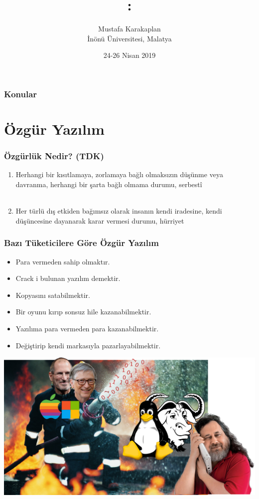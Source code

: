 \documentclass[english,svgnames,notes=hide,12pt]{beamer}
\title{\large\seminarname:\\\large\presentationtitle}
\author{Mustafa Karakaplan\\
    \small İnönü Üniversitesi, Malatya
}
\date{24-26 Nisan 2019}
\begin{document}
\thispagestyle{empty}
\begin{frame}
    \titlepage
\end{frame}

\begin{frame}
    \frametitle{Konular}
    \tableofcontents
\end{frame}


\section{Özgür Yazılım}

\begin{frame}
\frametitle{Özgürlük Nedir? (TDK)}

\begin{enumerate}[<+->]
\item  Herhangi bir kısıtlamaya, zorlamaya bağlı olmaksızın düşünme veya davranma, herhangi bir şarta bağlı olmama durumu, serbestî\\
~\\
\item Her türlü dış etkiden bağımsız olarak insanın kendi iradesine, kendi düşüncesine dayanarak karar vermesi durumu, hürriyet
\end{enumerate}

\end{frame}

\begin{frame}
\frametitle{Bazı Tüketicilere Göre Özgür Yazılım}
\begin{itemize}[<+->]
    \item Para vermeden sahip olmaktır.
    \item Crack i bulunan yazılım demektir.
    \item Kopyasını satabilmektir.
    \item Bir oyunu kırıp sonsuz hile kazanabilmektir. 
    \item Yazılıma para vermeden para kazanabilmektir.
    \item Değiştirip kendi markasıyla pazarlayabilmektir. 
\end{itemize}
\end{frame}

\begin{frame}
\includegraphics[width=1.0\textwidth]{imgs/software_wars}

\end{frame}
\end{document}
